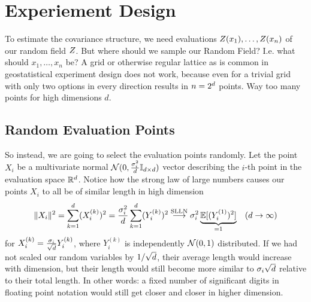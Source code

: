 \section{Experiement Design}

To estimate the covariance structure, we need evaluations
\(Z(x_1),\dots,Z(x_n)\) of our random
field \(Z\). But where should we sample our Random Field? I.e. what should
\(x_1,\dots, x_n\) be? A grid or otherwise regular lattice as is common in
geostatistical experiment design \parencite[e.g.][Section 4.1]{mullerCollectingSpatialData2007} does not work, because even for a trivial
grid with only two options in every direction results in \(n=2^d\) points.
Way too many points for high dimensions \(d\).

\subsection{Random Evaluation Points}

So instead, we are going to select the evaluation points randomly. Let the point
\(X_i\) be a multivariate normal \(\mathcal{N}(0,\frac{\sigma_i^2}{d}
\mathbb{I}_{d\times d})\) vector describing the \(i\)-th point
in the evaluation space \(\mathbb{R}^d\). Notice how the strong law of large
numbers causes our points \(X_i\) to all be of similar length in high dimension
\[
	\|X_i\|^2 = \sum_{k=1}^d (X_i^{(k)})^2
	= \frac{\sigma_i^2}{d} \sum_{k=1}^d (Y_i^{(k)})^2 
	\overset{\text{SLLN}}\longrightarrow\sigma_i^2\underbrace{\mathbb{E}[(Y_i^{(1)})^2]}_{=1} \quad (d\to \infty)
\]
for \(X_i^{(k)} = \frac{\sigma_i}{\sqrt{d}}Y_i^{(k)}\), where \(Y_i^{(k)}\) is
independently \(\mathcal{N}(0,1)\) distributed. If we had not scaled our random
variables by \(1/{\sqrt{d}}\), their average length would increase
with dimension, but their length would still become more similar to
\(\sigma_i\sqrt{d}\) relative to their total length. In other words:
a fixed number of significant digits in floating point notation would still get
closer and closer in higher dimension.

